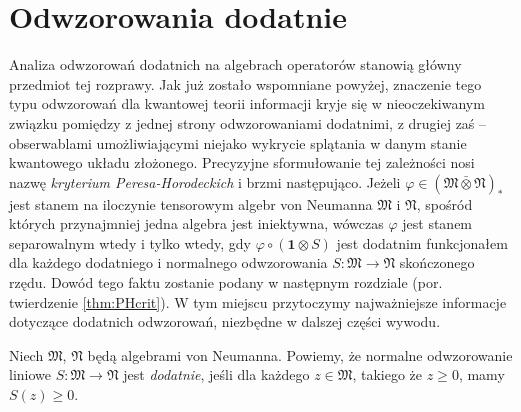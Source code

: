 \section{Odwzorowania dodatnie}
Analiza odwzorowań dodatnich na algebrach operatorów stanowią główny przedmiot
tej rozprawy.
Jak już zostało wspomniane powyżej, znaczenie tego typu odwzorowań dla kwantowej
teorii informacji kryje się w nieoczekiwanym związku pomiędzy z jednej strony
odwzorowaniami dodatnimi,
z drugiej zaś -- obserwablami umożliwiającymi niejako wykrycie splątania w
danym stanie kwantowego układu złożonego.
Precyzyjne sformułowanie tej zależności nosi nazwę \emph{kryterium Peresa-Horodeckich}
i brzmi następująco.
Jeżeli $\varphi \in (\mathfrak{M} \bar{\otimes} \mathfrak{N})_{*}$ jest stanem
na iloczynie tensorowym algebr von Neumanna
$\mathfrak{M}$ i $\mathfrak{N}$,
spośród których przynajmniej jedna algebra jest iniektywna,
wówczas $\varphi$ jest stanem separowalnym wtedy i tylko wtedy,
gdy $\varphi \circ (\mathbf{1} \otimes S)$ jest dodatnim funkcjonałem
dla każdego dodatniego i normalnego odwzorowania
$S: \mathfrak{M} \rightarrow \mathfrak{N}$
skończonego rzędu.
Dowód tego faktu zostanie podany w następnym rozdziale
(por. twierdzenie \ref{thm:PHcrit}).
W tym miejscu przytoczymy najważniejsze informacje dotyczące dodatnich
odwzorowań, niezbędne w dalszej części wywodu.

\begin{Definition}
Niech $\mathfrak{M}$, $\mathfrak{N}$ będą algebrami von Neumanna.
Powiemy, że normalne odwzorowanie liniowe
$S: \mathfrak{M} \rightarrow \mathfrak{N}$
jest \emph{dodatnie},
jeśli dla każdego $z \in \mathfrak{M}$,
takiego że $z \geq 0$, mamy
$S(z) \geq 0$.
\end{Definition}

